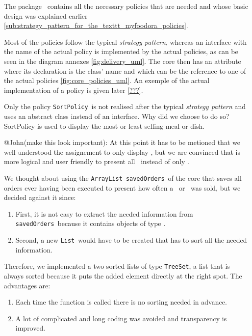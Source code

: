 The package \policies~contains all the necessary policies that are needed and whose basic design was explained earlier \ref{sub:strategy_pattern_for_the_texttt_myfoodora_policies}. 

Most of the policies follow the typical \emph{strategy pattern}, whereas an interface with the name of the actual policy is implemented by the actual policies, as can be seen in the diagram annexes \ref{fig:delivery_uml}. The core then has an attribute where its declaration is the class' name and which can be the reference to one of the actual policies \ref{fig:core_policies_uml}. An exemple of the actual implementation of a policy is given later \ref{???}.

Only the policy \lstinline|SortPolicy|~is not realised after the typical \emph{strategy pattern} and uses an abstract class instead of an interface. Why did we choose to do so? SortPolicy is used to display the most or least selling meal or dish. 

@John(make this look important): At this point it has to be metioned that we well understood the assignement to only display \HalfMeal, but we are convinced that is more logical and user friendly to present all \Meal~instead of only \HalfMeal. 

We thought about using the \lstinline|ArrayList|~\lstinline|savedOrders|~of the core that saves all orders ever having been executed to present how often a \Meal~or \Dish~was sold, but we decided against it since: 

\begin{enumerate}
	\item First, it is not easy to extract the needed information from \lstinline|savedOrders|~because it contains objects of type \Order.
	\item Second, a new \lstinline|List|~would have to be created that has to sort all the needed information.
\end{enumerate}

Therefore, we implemented a two sorted lists of type \lstinline|TreeSet|, a list that is always sorted because it puts the added element directly at the right spot. The advantages are:

\begin{enumerate}
	\item Each time the function is called there is no sorting needed in advance.
	\item A lot of complicated and long coding was avoided and transparency is improved.
\end{enumerate}

